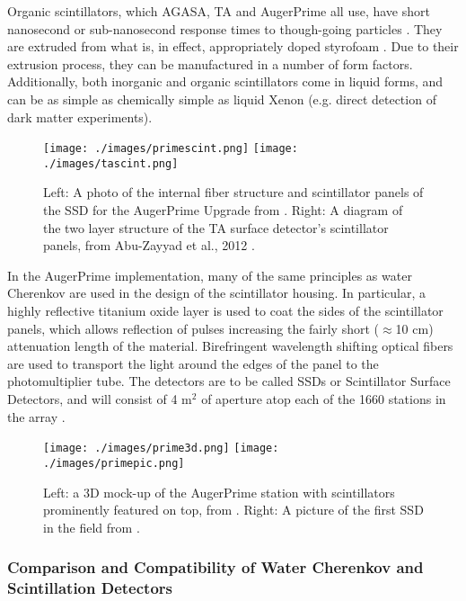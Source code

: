 Organic scintillators, which AGASA, TA and AugerPrime all use, have short nanosecond or sub-nanosecond response times to though-going particles \cite{augerscint,tadet,scints}. They are extruded from what is, in effect, appropriately doped styrofoam \cite{fermiscint}. Due to their extrusion process, they can be manufactured in a number of form factors. Additionally, both inorganic and organic scintillators come in liquid forms, and can be as simple as chemically simple as liquid Xenon (e.g. direct detection of dark matter experiments).

\begin{figure}[h!]
\begin{center}
\texttt{[image: ./images/primescint.png]}
\texttt{[image: ./images/tascint.png]}
\caption[Auger and TA Scintillators]{Left: A photo of the internal fiber structure and scintillator panels of the SSD for the AugerPrime Upgrade from \textcite{toprime}. Right: A diagram of the two layer structure of the TA surface detector's scintillator panels, from Abu-Zayyad et al., 2012 \cite{tadet}.}
\label{scintdiag}
\end{center}
\end{figure}

In the AugerPrime implementation, many of the same principles as water Cherenkov are used in the design of the scintillator housing. In particular, a highly reflective titanium oxide layer is used to coat the sides of the scintillator panels, which allows reflection of pulses increasing the fairly short ($\approx$10 cm) attenuation length of the material. Birefringent wavelength shifting optical fibers are used to transport the light around the edges of the panel to the photomultiplier tube. The detectors are to be called SSDs or Scintillator Surface Detectors, and will consist of 4 m$^2$ of aperture atop each of the 1660 stations in the array \cite{augerscint}.

\begin{figure}[h!]
\begin{center}
\texttt{[image: ./images/prime3d.png]}
\texttt{[image: ./images/primepic.png]}
\caption[AugerPrime Stations]{Left: a 3D mock-up of the AugerPrime station with scintillators prominently featured on top, from \cite{toprime}. Right: A picture of the first SSD in the field from \cite{augerscint}.}
\label{primepics}
\end{center}
\end{figure}
\subsubsection{Comparison and Compatibility of Water Cherenkov and Scintillation Detectors}

